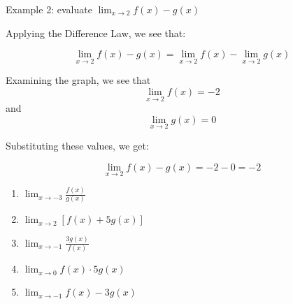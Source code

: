 Example 2: evaluate $\lim_{x\to2}f(x) - g(x)$

Applying the Difference Law, we see that:

$$\lim_{x\to2}f(x) - g(x) = \lim_{x\to2}f(x) - \lim_{x\to2}g(x)$$

Examining the graph, we see that $$\lim_{x\to2}f(x) = -2$$ and $$\lim_{x\to2}g(x) = 
0$$

Substituting these values, we get:

$$\lim_{x\to2}f(x) - g(x) = -2 - 0 = -2$$

\begin{Exercise}
    [title = Limits Practice 6, label=limits6]
\begin{enumerate}
    \item $\lim_{x\to-3} \frac{f(x)}{g(x)}$
    \item $\lim_{x\to2}\left[f(x) + 5g(x)\right]$
    \item $\lim_{x\to-1} \frac{3g(x)}{f(x)}$
    \item $\lim_{x\to0}f(x) \cdot 5g(x)$
    \item $\lim_{x\to-1} f(x) - 3g(x) $
\end{enumerate}
\vspace{40mm}
\end{Exercise}
